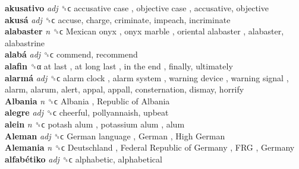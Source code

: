 \textbf{akusativo} \emph{adj}  ␝ϲ   accusative case ,  objective case , accusative, objective  \\
\textbf{akusá} \emph{adj}  ␝ϲ  accuse, charge, criminate, impeach, incriminate  \\
\textbf{alabaster} \emph{n}  ␝ϲ   Mexican onyx ,  onyx marble ,  oriental alabaster , alabaster, alabastrine  \\
\textbf{alabá} \emph{adj}  ␝ϲ  commend, recommend  \\
\textbf{alafin} ␝α   at last ,  at long last ,  in the end , finally, ultimately  \\
\textbf{alarmá} \emph{adj}  ␝ϲ   alarm clock ,  alarm system ,  warning device ,  warning signal , alarm, alarum, alert, appal, appall, consternation, dismay, horrify  \\
\textbf{Albania} \emph{n}  ␝ϲ   Albania ,  Republic of Albania   \\
\textbf{alegre} \emph{adj}  ␝ϲ  cheerful, pollyannaish, upbeat  \\
\textbf{alein} \emph{n}  ␝ϲ   potash alum ,  potassium alum , alum  \\
\textbf{Aleman} \emph{adj}  ␝ϲ   German language ,  German ,  High German   \\
\textbf{Alemania} \emph{n}  ␝ϲ   Deutschland ,  Federal Republic of Germany ,  FRG ,  Germany   \\
\textbf{alfabétiko} \emph{adj}  ␝ϲ  alphabetic, alphabetical  \\
